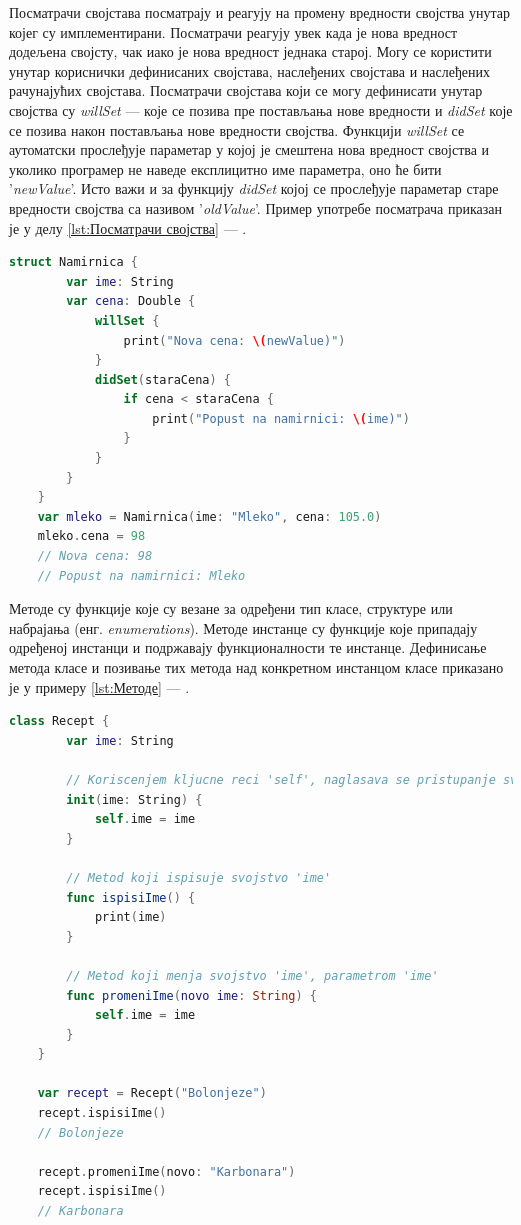 \documentclass[12pt,oneside]{memoir}
\begin{document}
\indent Посматрачи својстава посматрају и реагују на промену вредности својства унутар којег су имплементирани. Посматрачи реагују увек када је нова вредност додељена својсту, чак иако је нова вредност једнака старој. Могу се користити унутар кориснички дефинисаних својстава, наслеђених својстава и наслеђених рачунајућих својстава. Посматрачи својстава који се могу дефинисати унутар својства су \textit{willSet} --- које се позива пре постављања нове вредности и \textit{didSet} које се позива након постављања нове вредности својства. Функцији \textit{willSet} се аутоматски прослеђује параметар у којој је смештена нова вредност својства и уколико програмер не наведе експлицитно име параметра, оно ће бити '\textit{newValue}'. Исто важи и за функцију \textit{didSet} којој се прослеђује параметар старе вредности својства са називом '\textit{oldValue}'. Пример употребе посматрача приказан је у делу \ref{lst:Посматрачи својства} --- .

\begin{lstlisting}[caption=\textit{{Посматрачи својства}}, label={lst:Посматрачи својства}, language=Swift, frame=single]
    struct Namirnica {
        var ime: String
        var cena: Double {
            willSet {
                print("Nova cena: \(newValue)")
            }
            didSet(staraCena) {
                if cena < staraCena {
                    print("Popust na namirnici: \(ime)")
                }
            }
        }
    }
    var mleko = Namirnica(ime: "Mleko", cena: 105.0)
    mleko.cena = 98
    // Nova cena: 98
    // Popust na namirnici: Mleko
\end{lstlisting}

\indent Методе су функције које су везане за одређени тип класе, структуре или набрајања (енг. \textit{enumerations}). Методе инстанце су функције које припадају одређеној инстанци и подржавају функционалности те инстанце. Дефинисање метода класе и позивање тих метода над конкретном инстанцом класе приказано је у примеру \ref{lst:Методе} --- .

\begin{lstlisting}[caption=\textit{{Методе}}, label={lst:Методе}, language=Swift, frame=single]
    class Recept {
        var ime: String
        
        // Koriscenjem kljucne reci 'self', naglasava se pristupanje svojstvu/metodi klase
        init(ime: String) {
            self.ime = ime
        }
        
        // Metod koji ispisuje svojstvo 'ime'
        func ispisiIme() {
            print(ime)
        }
        
        // Metod koji menja svojstvo 'ime', parametrom 'ime'
        func promeniIme(novo ime: String) {
            self.ime = ime
        }
    }
    
    var recept = Recept("Bolonjeze")
    recept.ispisiIme()
    // Bolonjeze
    
    recept.promeniIme(novo: "Karbonara")
    recept.ispisiIme()
    // Karbonara
    
\end{lstlisting}
\end{document}

